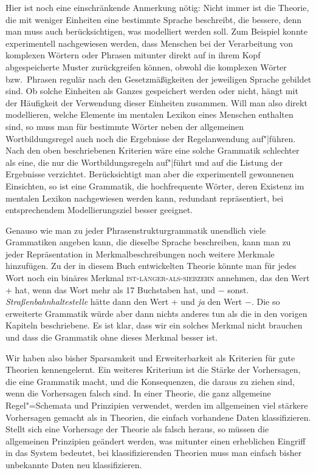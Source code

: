 Hier ist noch eine einschränkende Anmerkung nötig: Nicht immer ist die Theorie, die mit weniger
Einheiten eine bestimmte Sprache beschreibt, die bessere, denn man muss auch berücksichtigen,
was modelliert werden soll. Zum Beispiel konnte experimentell nachgewiesen werden, dass
Menschen bei der Verarbeitung von komplexen Wörtern oder Phrasen mitunter direkt auf in ihrem
Kopf abgespeicherte Muster zurückgreifen können, obwohl die komplexen Wörter bzw.\ Phrasen
regulär nach den Gesetzmäßigkeiten der jeweiligen Sprache gebildet sind. Ob solche Einheiten
als Ganzes gespeichert werden oder nicht, hängt mit der Häufigkeit der Verwendung dieser
Einheiten zusammen. Will man also direkt modellieren, welche Elemente im mentalen Lexikon eines
Menschen enthalten sind, so muss man für bestimmte Wörter neben der allgemeinen Wortbildungsregel
auch noch die Ergebnisse der Regelanwendung auf"|führen. Nach den oben beschriebenen Kriterien
wäre eine solche Grammatik schlechter als eine, die nur die Wortbildungsregeln auf"|führt
und auf die Listung der Ergebnisse verzichtet. Berücksichtigt man aber die experimentell gewonnenen
Einsichten, so ist eine Grammatik, die hochfrequente Wörter, deren Existenz im mentalen Lexikon
nachgewiesen werden kann, redundant repräsentiert, bei entsprechendem Modellierungsziel besser geeignet.

Genauso wie man zu jeder Phrasenstrukturgrammatik unendlich viele Grammatiken angeben kann,
die dieselbe Sprache beschreiben,
kann man zu jeder Repräsentation in Merkmalbeschreibungen noch weitere Merkmale hinzufügen. Zu der
in diesem Buch entwickelten Theorie könnte man für jedes Wort noch ein binäres
Merkmal \textsc{ist-länger-als-siebzehn} annehmen, das den Wert + hat, wenn das Wort mehr als 17 Buchstaben
hat, und $-$ sonst. \emph{Straßenbahnhaltestelle} hätte dann den Wert + und \emph{ja} den Wert $-$.
Die so erweiterte Grammatik würde aber dann nichts anderes tun als die in den vorigen Kapiteln
beschriebene. Es ist klar, dass wir ein solches Merkmal nicht brauchen und dass die Grammatik
ohne dieses Merkmal besser ist.

Wir haben also bisher Sparsamkeit und Erweiterbarkeit als Kriterien für gute Theorien
kennengelernt. Ein weiteres Kriterium ist die Stärke der Vorhersagen, die eine Grammatik macht,
und die Konsequenzen, die daraus zu ziehen sind, wenn die Vorhersagen falsch sind.
In einer Theorie, die ganz allgemeine Regel"=Schemata und Prinzipien verwendet, werden im allgemeinen
viel stärkere Vorhersagen gemacht als in Theorien, die einfach vorhandene Daten klassifizieren.
Stellt sich eine Vorhersage der Theorie als falsch heraus, so müssen die allgemeinen Prinzipien
geändert werden, was mitunter einen erheblichen Eingriff in das System bedeutet,
bei klassifizierenden Theorien muss man einfach bisher unbekannte Daten neu klassifizieren.

